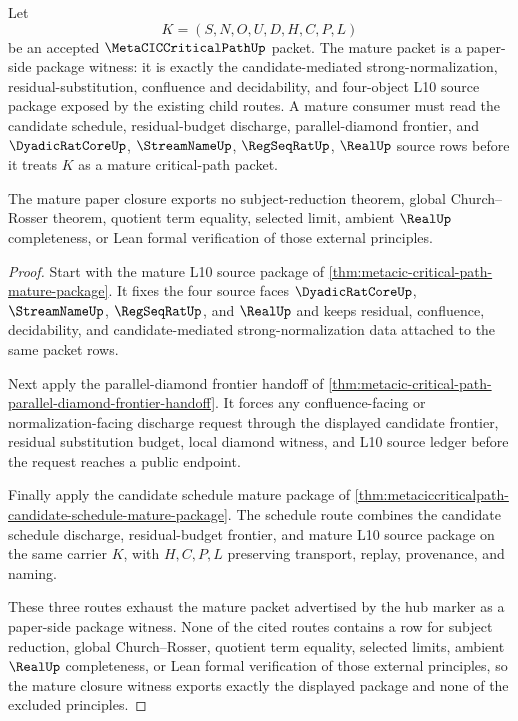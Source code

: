 \begin{theorem}
\label{thm:metacic-criticalpath-mature-closure-witness}
Let
$$
K=(S,N,O,U,D,H,C,P,L)
$$
be an accepted $\MetaCICCriticalPathUp$ packet. The mature packet is a paper-side package witness: it is exactly the candidate-mediated strong-normalization, residual-substitution, confluence and decidability, and four-object L10 source package exposed by the existing child routes. A mature consumer must read the candidate schedule, residual-budget discharge, parallel-diamond frontier, and $\DyadicRatCoreUp$, $\StreamNameUp$, $\RegSeqRatUp$, $\RealUp$ source rows before it treats $K$ as a mature critical-path packet.

The mature paper closure exports no subject-reduction theorem, global Church--Rosser theorem, quotient term equality, selected limit, ambient $\RealUp$ completeness, or Lean formal verification of those external principles.
\end{theorem}
\begin{proof}
Start with the mature L10 source package of \autoref{thm:metacic-critical-path-mature-package}. It fixes the four source faces $\DyadicRatCoreUp$, $\StreamNameUp$, $\RegSeqRatUp$, and $\RealUp$ and keeps residual, confluence, decidability, and candidate-mediated strong-normalization data attached to the same packet rows.

Next apply the parallel-diamond frontier handoff of \autoref{thm:metacic-critical-path-parallel-diamond-frontier-handoff}. It forces any confluence-facing or normalization-facing discharge request through the displayed candidate frontier, residual substitution budget, local diamond witness, and L10 source ledger before the request reaches a public endpoint.

Finally apply the candidate schedule mature package of \autoref{thm:metaciccriticalpath-candidate-schedule-mature-package}. The schedule route combines the candidate schedule discharge, residual-budget frontier, and mature L10 source package on the same carrier $K$, with $H,C,P,L$ preserving transport, replay, provenance, and naming.

These three routes exhaust the mature packet advertised by the hub marker as a paper-side package witness. None of the cited routes contains a row for subject reduction, global Church--Rosser, quotient term equality, selected limits, ambient $\RealUp$ completeness, or Lean formal verification of those external principles, so the mature closure witness exports exactly the displayed package and none of the excluded principles.
\end{proof}
